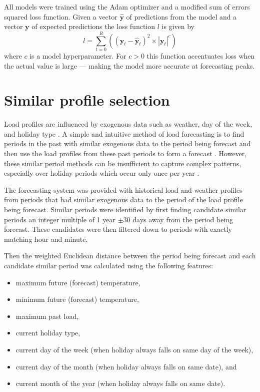 All models were trained using the Adam optimizer \cite{Kingma2014} and a modified sum of errors squared loss function.
Given a vector $\boldsymbol{\hat{y}}$ of predictions from the model and a vector $\boldsymbol{y}$ of expected predictions the loss function $l$ is given by 
\begin{equation}
l = \sum_{t=0}^{R}((\boldsymbol{y}_t - \boldsymbol{\hat{y}}_t)^2 \times |\boldsymbol{y}_t|^c)
\end{equation}
where $c$ is a model hyperparameter.
For $c>0$ this function accentuates loss when the actual value is large --- making the model more accurate at forecasting peaks.


\section{Similar profile selection} \label{simperiod}
Load profiles are influenced by exogenous data such as weather, day of the week, and holiday type \cite{Weron2006}.
A simple and intuitive method of load forecasting is to find periods in the past with similar exogenous data to the period being forecast and then use the load profiles from these past periods to form a forecast \cite{Senjyu1998}.
However, these similar period methods can be insufficient to capture complex patterns, especially over holiday periods which occur only once per year \cite{Chen2010}.


The forecasting system was provided with historical load and weather profiles from periods that had similar exogenous data to the period of the load profile being forecast.
Similar periods were identified by first finding candidate similar periods an integer multiple of 1 year $\pm$30 days away from the period being forecast.
These candidates were then filtered down to periods with exactly matching hour and minute.

Then the weighted Euclidean distance between the period being forecast and each candidate similar period was calculated using the following features: 
\begin{itemize}
	\item maximum future (forecast) temperature, 
	\item minimum future (forecast) temperature,
	\item maximum past load,
	\item current holiday type, 
	\item current day of the week (when holiday always falls on same day of the week),
	\item current day of the month (when holiday always falls on same date), and
	\item current month of the year (when holiday always falls on same date).
\end{itemize}

